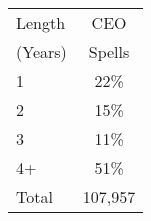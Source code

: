 \begin{tabular}{lc}
\toprule
Length & CEO \\
(Years) & Spells \\
\midrule
1 & 22\%  \\
2 & 15\%  \\
3 & 11\%  \\
4+ & 51\%  \\
Total &      107,957 \\
\bottomrule
\end{tabular}
